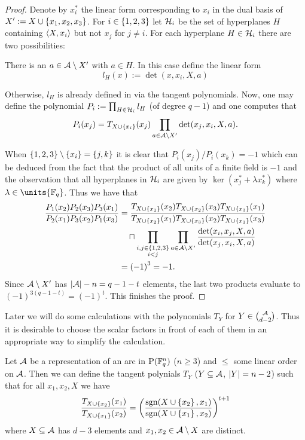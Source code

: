 \begin{proof}
    Denote by $x_i^{\ast}$ the linear form corresponding to $x_i$ in the dual basis of $X':=X\cup\left\{x_1,x_2,x_3\right\}$.
    For $i\in\left\{1,2,3\right\}$ let $\mathcal{H}_i$ be the set of hyperplanes $H$ containing $\gen{X,x_i}$ but not $x_j$ for $j\neq i$.
    For each hyperplane $H\in \mathcal{H}_i$ there are two possibilities:
    \begin{casebycase}
        \item There is an $a\in\mathcal{A}\setminus X'$ with $a\in H$. In this case define the linear form
    $$
    l_H(x):=\det(x,x_i,X,a)
    $$
        \item Otherwise, $l_H$ is already defined in via the tangent polynomials.
    Now, one may define the polynomial $P_i:=\prod_{H\in \mathcal{H}_i}{l_H}$ (of degree $q-1$) and one computes that
    $$
    P_i(x_j)=T_{X\cup\left\{x_i\right\}}(x_j)\prod_{a\in\mathcal{A}\setminus X'}{\det(x_j,x_i,X,a)}.
    $$%
    \end{casebycase}
    When $\left\{1,2,3\right\}\setminus\left\{x_i\right\}=\left\{j,k\right\}$ it is clear that $P_i(x_j)/P_i(x_k)=-1$ which can be deduced from the fact that the product of all units of a finite field is $-1$ and the observation that all hyperplanes in $\mathcal{H}_i$ are given by $\ker(x_j^{\ast}+\lambda x_k^{\ast})$ where $\lambda\in\units{\field{q}}$.
    Thus we have that
    \begin{align*}
        \frac{P_1(x_2)P_2(x_3)P_3(x_1)}{P_2(x_1)P_3(x_2)P_1(x_3)} &= \frac{T_{X\setjoin\set{x_1}}(x_2)T_{X\setjoin\set{x_2}}(x_3)T_{X\setjoin\set{x_3}}(x_1)}{T_{X\setjoin\set{x_2}}(x_1)T_{X\setjoin\set{x_3}}(x_2)T_{X\setjoin\set{x_1}}(x_3)}\\
        & \quad\settimes\prod_{\substack{i,j\in\set{1,2,3}\\ i<j}}\prod_{a\in\cA\setminus X'}{\frac{\det(x_i,x_j,X,a)}{\det(x_j,x_i,X,a)}}\\
        & = {(-1)}^3=-1.
    \end{align*}
    Since $\mathcal{A}\setminus X'$ has $\left|\mathcal{A}\right|-n=q-1-t$ elements, the last two products evaluate to ${(-1)}^{3(q-1-t)}={(-1)}^t$.
    This finishes the proof.
\end{proof}

Later we will do some calculations with the polynomials $T_Y$ for $Y\in\binom{\cA}{d-2}$. Thus it is desirable to choose the scalar factors in front of each of them in an appropriate way to simplify the calculation.
\begin{corollary}\label{mds-segre-simplified}
    Let $\mathcal{A}$ be a representation of an arc in $\P(\field{q}^n)$ ($n\geq 3$) and $\leq$ some linear
    order on $\mathcal{A}$. Then we can define the tangent polynials $T_Y$
    ($Y\subseteq \mathcal{A}$, $\left|Y\right|=n-2$) such that for all $x_1,x_2,X$ we have
    $$    \frac{T_{X\cup\left\{x_2\right\}}(x_1)}{T_{X\cup\left\{x_1\right\}}(x_2)}={\left(\frac{\mathop\mathrm{sgn}(X\cup\left\{x_2\right\},x_1)}{\mathop\mathrm{sgn}(X\cup\left\{x_1\right\},x_2)}\right)}^{t+1}
    $$
    where $X\subseteq \mathcal{A}$ has $d-3$ elements and $x_1,x_2\in \mathcal{A}\setminus X$ are distinct.
\end{corollary}

